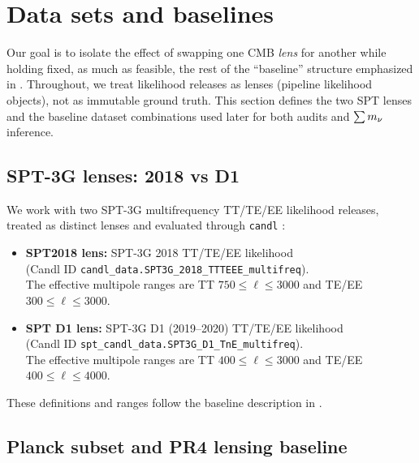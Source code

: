 \section{Data sets and baselines}
\label{sec:baselines}

Our goal is to isolate the effect of swapping one CMB \emph{lens} for another while holding fixed, as much as feasible, the rest of the ``baseline'' structure emphasized in \cite{arxiv2601_16277}. Throughout, we treat likelihood releases as lenses (pipeline likelihood objects), not as immutable ground truth. This section defines the two SPT lenses and the baseline dataset combinations used later for both audits and $\sum m_\nu$ inference.

\subsection{SPT-3G lenses: 2018 vs D1}
\label{sec:spt-lenses}

We work with two SPT-3G multifrequency TT/TE/EE likelihood releases, treated as distinct lenses and evaluated through \texttt{candl} \cite{candl}:
\begin{itemize}[leftmargin=*, itemsep=2pt]
  \item \textbf{SPT2018 lens:} SPT-3G 2018 TT/TE/EE likelihood \cite{spt3g2018_ttteee}\\
    (Candl ID \texttt{candl\_data.SPT3G\_2018\_TTTEEE\_multifreq}).\\
    The effective multipole ranges are TT $750\le \ell\le 3000$ and TE/EE $300\le \ell\le 3000$.
  \item \textbf{SPT D1 lens:} SPT-3G D1 (2019--2020) TT/TE/EE likelihood \cite{spt3g_d1}\\
    (Candl ID \texttt{spt\_candl\_data.SPT3G\_D1\_TnE\_multifreq}).\\
    The effective multipole ranges are TT $400\le \ell\le 3000$ and TE/EE $400\le \ell\le 4000$.
\end{itemize}
These definitions and ranges follow the baseline description in \cite{arxiv2601_16277}.

\subsection{Planck subset and PR4 lensing baseline}
\label{sec:planck-subset}


